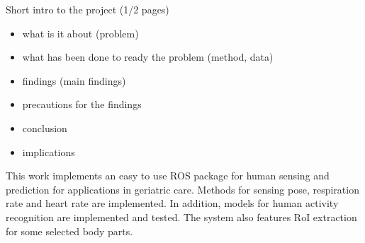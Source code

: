 {\color{red}Short intro to the project (1/2 pages)

\begin{itemize}
\item what is it about (problem)
\item what has been done to ready the problem (method, data)
\item findings (main findings)
\item precautions for the findings
\item conclusion
\item implications
\end{itemize}
}

This work implements an easy to use ROS package for human sensing and prediction for applications in geriatric care. Methods for sensing pose, respiration rate and heart rate are implemented. In addition, models for human activity recognition are implemented and tested. The system also features RoI extraction for some selected body parts.

